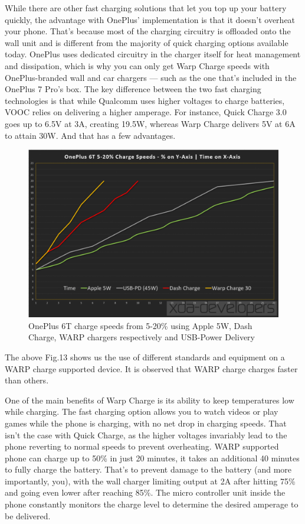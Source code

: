 \documentclass[conference]{IEEEtran}
\begin{document}
While there are other fast charging solutions that let you top up your battery quickly, the advantage with OnePlus' implementation is that it doesn't overheat your phone. That's because most of the charging circuitry is offloaded onto the wall unit and is different from the majority of quick charging options
available today\cite{b17}. OnePlus uses dedicated circuitry in the charger itself for heat management and dissipation, which is why you can only get Warp Charge speeds with OnePlus-branded wall and car chargers — such as the one that's included in the OnePlus 7 Pro's box. The key difference between the two fast charging technologies is that while Qualcomm uses higher voltages to charge batteries, VOOC relies on delivering a higher amperage. For instance, Quick Charge 3.0 goes up to 6.5V at 3A, creating 19.5W, whereas Warp Charge delivers 5V at 6A to attain 30W. And that has a few advantages\cite{b17}. 

\begin{figure}[h!]
  \includegraphics[width=\linewidth]{images/image13}
  \caption{OnePlus 6T charge speeds from 5-20\% using Apple 5W, Dash Charge, WARP chargers respectively and USB-Power Delivery\cite{b18}}
\end{figure}

The above Fig.13 shows us the use of different standards and equipment on a WARP charge supported device. It is observed that WARP charge charges faster than others.

One of the main benefits of Warp Charge is its ability to keep temperatures low while charging. The fast charging option allows you to watch videos or play games while the phone is charging, with no net drop in charging speeds. That isn't the case with Quick Charge, as the higher voltages invariably lead to the phone reverting to normal speeds to prevent overheating\cite{b17}. WARP supported phone can charge up to 50\% in just 20 minutes, it takes an additional 40 minutes to fully charge the battery. That's to prevent damage to the battery (and more importantly, you), with the wall charger limiting output at 2A after hitting 75\% and going even lower after reaching 85\%. The micro controller unit inside the phone constantly monitors the charge level to determine the desired amperage to be delivered\cite{b17}.
\end{document}

